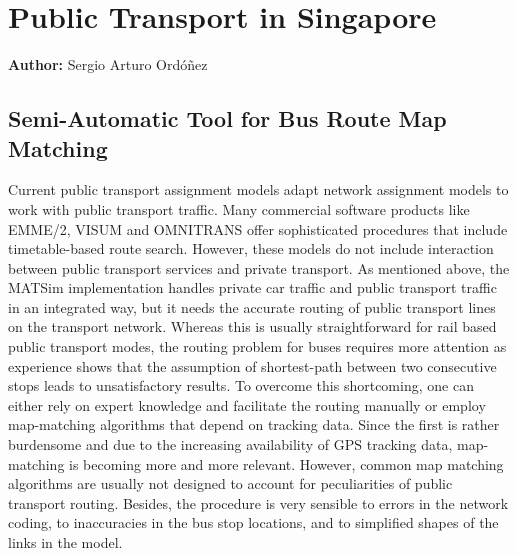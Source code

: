




\section{Public Transport in Singapore}
\hfill \textbf{Author:} Sergio Arturo Ordóñez

\subsection{Semi-Automatic Tool for Bus Route Map Matching}
\citet[][]{Ordonez_HKSTS_2011}
Current public transport assignment models adapt network assignment models to work with public transport traffic. Many commercial software products like EMME/2, VISUM and OMNITRANS offer sophisticated procedures that include timetable-based route search. However, these models do not include interaction between public transport services and private transport. As mentioned above, the MATSim implementation handles private car traffic and public transport traffic in an integrated way, but it needs the accurate routing of public transport lines on the transport network. Whereas this is usually straightforward for rail based public transport modes, the routing problem for buses requires more attention as experience shows that the assumption of shortest-path between two consecutive stops leads to unsatisfactory results. To overcome this shortcoming, one can either rely on expert knowledge and facilitate the routing manually or employ map-matching algorithms that depend on tracking data. Since the first is rather burdensome and due to the increasing availability of GPS tracking data, map-matching is becoming more and more relevant. However, common map matching algorithms are usually not designed to account for peculiarities of public transport routing. Besides, the procedure is very sensible to errors in the network coding, to inaccuracies in the bus stop locations, and to simplified shapes of the links in the model.


